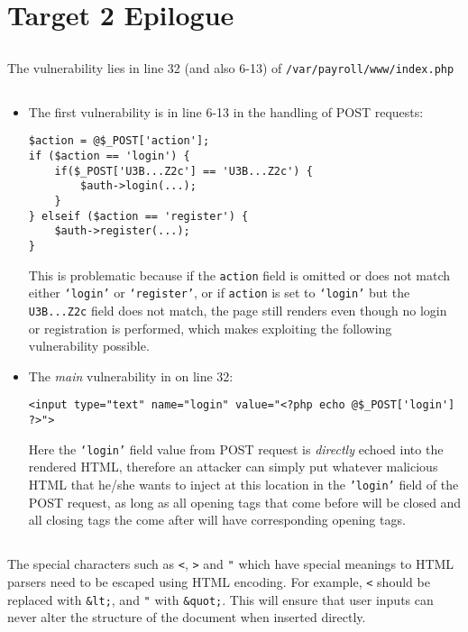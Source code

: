 \documentclass[11pt]{article}
\begin{document}
\section{Target 2 Epilogue}
\subsection{}
The vulnerability lies in line 32 (and also 6-13) of \texttt{/var/payroll/www/index.php}
\subsection{}
\begin{itemize}
\item The first vulnerability is in line 6-13 in the handling of POST requests:
\begin{verbatim}
$action = @$_POST['action'];
if ($action == 'login') {
    if($_POST['U3B...Z2c'] == 'U3B...Z2c') {
        $auth->login(...);
    }
} elseif ($action == 'register') {
    $auth->register(...);
}
\end{verbatim}
This is problematic because if the \texttt{action} field is omitted or does not match either \texttt{`login'} or \texttt{`register'}, or if \texttt{action} is set to \texttt{`login'} but the \texttt{U3B...Z2c} field does not match, the page still renders even though no login or registration is performed, which makes exploiting the following vulnerability possible.
\item The \textit{main} vulnerability in on line 32:
\begin{verbatim}
<input type="text" name="login" value="<?php echo @$_POST['login'] ?>">
\end{verbatim}
Here the \texttt{`login'} field value from POST request is \textit{directly} echoed into the rendered HTML, therefore an attacker can simply put whatever malicious HTML that he/she wants to inject at this location in the \texttt{'login'} field of the POST request, as long as all opening tags that come before will be closed and all closing tags the come after will have corresponding opening tags.
\end{itemize}
\subsection{}
The special characters such as \texttt{<}, \texttt{>} and \texttt{"} which have special meanings to HTML parsers need to be escaped using HTML encoding. For example, \texttt{<} should be replaced with \texttt{\&lt;}, and \texttt{"} with \texttt{\&quot;}. This will ensure that user inputs can never alter the structure of the document when inserted directly.
\end{document}
